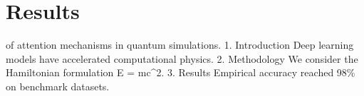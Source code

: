 \section{Results}

of attention mechanisms in quantum simulations.
1. Introduction
Deep learning models have accelerated computational physics.
2. Methodology
We consider the Hamiltonian formulation E = mc^2.
3. Results
Empirical accuracy reached 98\% on benchmark datasets.
